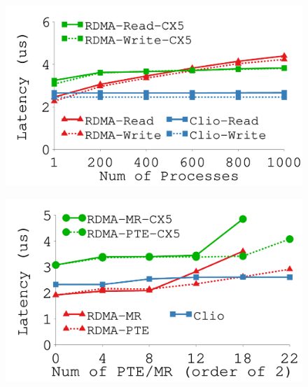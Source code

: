{
\begin{figure}[th]
\begin{minipage}{\figWidthSix}
\begin{center}
\centerline{\includegraphics[width=\columnwidth]{Figures/g_plot_scalability_conn.pdf}}
\vspace{-0.1in}
\captionsetup{width=.9\columnwidth}
{
}
\end{center}
\end{minipage}
\begin{minipage}{\figWidthSix}
\begin{center}
\centerline{\includegraphics[width=\columnwidth]{Figures/g_plot_scalability_pte.pdf}}
\vspace{-0.1in}
\captionsetup{width=.9\columnwidth}

\end{center}
\end{minipage}
\end{figure}}

